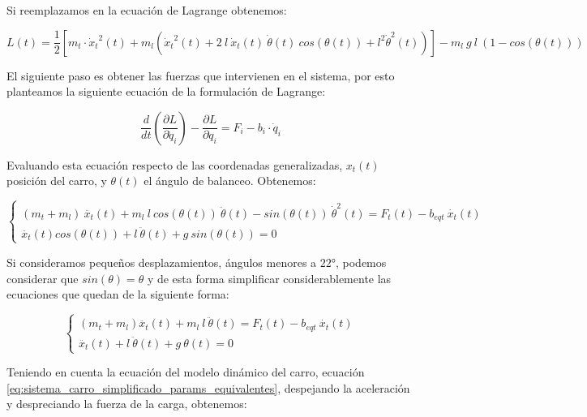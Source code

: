 \documentclass[11pt]{article}
\begin{document}
Si reemplazamos en la ecuación de Lagrange obtenemos:

\begin{equation}
	\label{eq:lagrangiano_completo}
	L(t)=\frac{1}{2}\left [ m_{t}\cdot {\dot{x}_{t}}^{2}(t)+m_{l} \left ( {\dot{x}_{t}}^{2}(t)+2\ l\ \dot{x}_{t}(t)\ \dot{\theta}(t)\ cos(\theta(t))+ {l}^2 {\dot{\theta}}^{2}(t) \right ) \right ]-m_{l}\ g\ l\ (1-cos(\theta (t)))
\end{equation}

El siguiente paso es obtener las fuerzas que intervienen en el sistema, por esto planteamos la siguiente ecuación de la formulación de Lagrange:

\begin{equation}
	\label{eq:lagrangiano_ecuacion_diferencial}
	\frac{d}{dt}\left ( \frac{\partial L}{\partial \dot{q}_{i}} \right ) -\frac{\partial L}{\partial q_{i}}=F_{i}-b_{i}\cdot \dot{q}_{i}
\end{equation}

Evaluando esta ecuación respecto de las coordenadas generalizadas, $x_{t}(t)$ posición del carro, y $\theta(t)$ el ángulo de balanceo. Obtenemos:

\begin{equation}
	\label{eq:lagrangiano_coordenadas_generalizadas}
	\left \{\begin{matrix}(m_t+m_l)\ \ddot{x_t}(t)+m_l\ l\ cos(\theta (t))\ \ddot{\theta }(t)-sin(\theta (t))\ \dot{\theta }^{2}(t)=F_t(t)-b_{eqt}\ \dot{x_t}(t)\\ \ddot{x_t}(t)cos(\theta (t))+l\ \ddot{\theta }(t)+g\ sin(\theta (t))=0\end{matrix}\right.
\end{equation}

Si consideramos pequeños desplazamientos, ángulos menores a $22°$, podemos considerar que $sin(\theta)=\theta$ y de esta forma simplificar considerablemente las ecuaciones que quedan de la siguiente forma:

\begin{equation}
	\label{eq:lagrangiano_coordenadas_generalizadas_simplificadas}
	\left \{\begin{matrix}(m_t+m_l)\ddot{x_t}(t)+m_l\ l\ \ddot{\theta }(t)=F_t(t)-b_{eqt}\ \dot{x_t}(t)\\ \ddot{x_t}(t)+l\ \ddot{\theta }(t)+g\ \theta (t)=0\end{matrix}\right.
\end{equation}

Teniendo en cuenta la ecuación del modelo dinámico del carro, ecuación \ref{eq:sistema_carro_simplificado_params_equivalentes}, despejando la aceleración y despreciando la fuerza de la carga, obtenemos:
\end{document}
